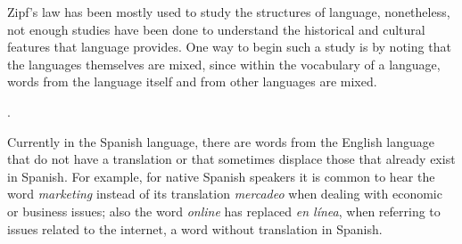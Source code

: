 \documentclass[10pt,letterpaper]{article} %
\begin{document}
 
 
Zipf's law has been mostly used to study the structures of language,
nonetheless, not enough studies have been done to understand the historical and
cultural features that language provides. One way to begin such a study is by
noting that the languages themselves are mixed, since within the vocabulary of
a language, words from the language itself and from other languages
are mixed.
 
.

Currently in the Spanish language, there are words from the English language
that do not have a translation or that sometimes displace those that already
exist in Spanish.  For example, for native Spanish speakers it is common to
hear the word \textit{marketing} instead of its translation \textit{mercadeo}
when dealing with economic or business issues; also the word \textit{online}
has replaced \textit{en línea}, when referring to issues related to the
internet, a word without translation in Spanish.
 
\end{document}
